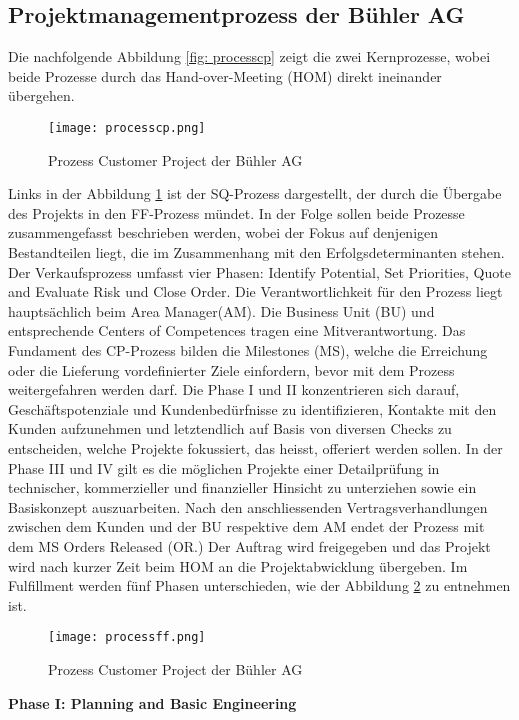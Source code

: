 \subsection{Projektmanagementprozess der Bühler AG}\label{zweieins}
Die nachfolgende Abbildung \ref{fig: processcp} zeigt die zwei Kernprozesse, wobei beide Prozesse durch das Hand-over-Meeting (HOM) direkt ineinander übergehen. 
\begin{figure}[H]
	\centering
	\texttt{[image: processcp.png]}
	\caption{Prozess Customer Project der Bühler AG}
	\label{fig:processcp}
\end{figure}
Links in der Abbildung \ref{fig:processcp} ist der SQ-Prozess dargestellt, der durch die Übergabe des Projekts in den FF-Prozess mündet. In der Folge sollen beide Prozesse zusammengefasst beschrieben werden, wobei der Fokus auf denjenigen Bestandteilen liegt, die im Zusammenhang mit den Erfolgsdeterminanten stehen. Der Verkaufsprozess umfasst vier Phasen: Identify Potential, Set Priorities, Quote and Evaluate Risk und Close Order. Die Verantwortlichkeit für den Prozess liegt hauptsächlich beim Area Manager(AM). Die Business Unit (BU) und entsprechende Centers of Competences tragen eine Mitverantwortung. Das Fundament des CP-Prozess bilden die Milestones (MS), welche die Erreichung oder die Lieferung vordefinierter Ziele einfordern, bevor mit dem Prozess weitergefahren werden darf. Die Phase I und II konzentrieren sich darauf, Geschäftspotenziale und Kundenbedürfnisse zu identifizieren, Kontakte mit den Kunden aufzunehmen und letztendlich auf Basis von diversen Checks zu entscheiden,  welche Projekte fokussiert, das heisst, offeriert werden sollen. In der Phase III und IV gilt es die möglichen Projekte einer Detailprüfung in technischer, kommerzieller und finanzieller Hinsicht zu unterziehen sowie ein Basiskonzept auszuarbeiten. Nach den anschliessenden Vertragsverhandlungen zwischen dem Kunden und der BU respektive dem AM endet der Prozess mit dem MS Orders Released (OR.) Der Auftrag wird freigegeben und das Projekt wird nach kurzer Zeit beim HOM an die Projektabwicklung übergeben. Im Fulfillment werden fünf Phasen unterschieden, wie der Abbildung \ref{fig: processff} zu entnehmen ist.
\begin{figure}[H]
	\centering
	\texttt{[image: processff.png]}
	\caption{Prozess Customer Project der Bühler AG}
	\label{fig: processff}
\end{figure}
\textbf{Phase I: Planning and Basic Engineering}
\newline
